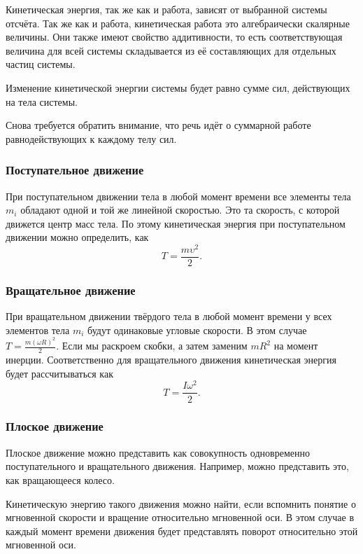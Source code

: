 Кинетическая энергия, так же как и работа, зависят от выбранной системы
отсчёта. Так же как и работа, кинетическая работа это алгебраически скалярные
величины. Они также имеют свойство аддитивности, то есть соответствующая
величина для всей системы складывается из её составляющих для отдельных частиц
системы.

\begin{theorem}%
	\label{thrm:kinetic-energy}
	Изменение кинетичес\-кой энергии системы будет равно сумме сил, действующих на
	тела системы.
\end{theorem}

Снова требуется обратить внимание, что речь идёт о суммарной работе
равнодействующих к каждому телу сил.

\subsubsection{Поступательное движение}
При поступательном движении тела в любой момент времени все элементы тела $m_i$
обладают одной и той же линейной скоростью. Это та скорость, с которой движется
центр масс тела. По этому кинетическая энергия при поступательном движении
можно определить, как \[
	T = \frac{m \upsilon^2}{2}
	.\]

\subsubsection{Вращательное движение}
При вращательном движении твёрдого тела в любой момент времени у всех элементов
тела $m_i$ будут одинаковые угловые скорости. В этом случае \( T = \frac{m
	(\omega R)^2}{2} \). Если мы раскроем скобки, а затем заменим \( m R^2 \) на
момент инерции. Соответственно для вращательного движения кинетическая энергия
будет рассчитываться как \[
	T = \frac{I \omega^2}{2}
	.\]

\subsubsection{Плоское движение}

Плоское движение можно представить как совокупность одновременно
поступательного и вращательного движения. Например, можно представить это, как
вращающееся колесо.

Кинетическую энергию такого движения можно найти, если вспомнить понятие о
мгновенной скорости и вращение относительно мгновенной оси. В этом случае в
каждый момент времени движения будет представлять поворот относительно этой
мгновенной оси.

